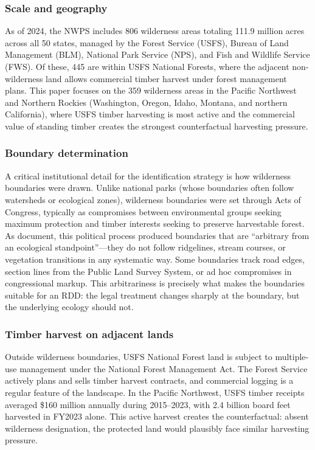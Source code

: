 \documentclass[12pt]{article}
\begin{document}
\subsubsection*{Scale and geography} As of 2024, the NWPS includes 806 wilderness areas totaling 111.9 million acres across all 50 states, managed by the Forest Service (USFS), Bureau of Land Management (BLM), National Park Service (NPS), and Fish and Wildlife Service (FWS). Of these, 445 are within USFS National Forests, where the adjacent non-wilderness land allows commercial timber harvest under forest management plans. This paper focuses on the 359 wilderness areas in the Pacific Northwest and Northern Rockies (Washington, Oregon, Idaho, Montana, and northern California), where USFS timber harvesting is most active and the commercial value of standing timber creates the strongest counterfactual harvesting pressure.

\subsubsection*{Boundary determination} A critical institutional detail for the identification strategy is how wilderness boundaries were drawn. Unlike national parks (whose boundaries often follow watersheds or ecological zones), wilderness boundaries were set through Acts of Congress, typically as compromises between environmental groups seeking maximum protection and timber interests seeking to preserve harvestable forest. As \citet{ScottSuffrinfenAndAgrawal2001} document, this political process produced boundaries that are ``arbitrary from an ecological standpoint''---they do not follow ridgelines, stream courses, or vegetation transitions in any systematic way. Some boundaries track road edges, section lines from the Public Land Survey System, or ad hoc compromises in congressional markup. This arbitrariness is precisely what makes the boundaries suitable for an RDD: the legal treatment changes sharply at the boundary, but the underlying ecology should not.

\subsubsection*{Timber harvest on adjacent lands} Outside wilderness boundaries, USFS National Forest land is subject to multiple-use management under the National Forest Management Act. The Forest Service actively plans and sells timber harvest contracts, and commercial logging is a regular feature of the landscape. In the Pacific Northwest, USFS timber receipts averaged \$160 million annually during 2015--2023, with 2.4 billion board feet harvested in FY2023 alone. This active harvest creates the counterfactual: absent wilderness designation, the protected land would plausibly face similar harvesting pressure.
\end{document}
